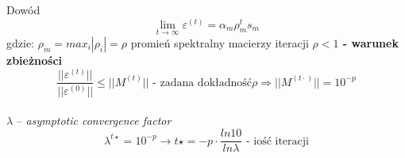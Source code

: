 \begin{frame}{}
  \begin{block}{Dowód}
    \[\lim_{t\to\infty} \varepsilon^{(t)} = \alpha _m \rho _m^t s_m\]
    gdzie: $\rho _m = max_i |\rho _i|= \rho$ promień spektralny macierzy iteracji
    \center \textbf{$\rho < 1$ - warunek zbieżności}
    $$ \frac{||\varepsilon^{(t)}||}{||\varepsilon^{(0)}||} \leq ||M^{(t)}|| \text{ - zadana dokładność} \rho\Rightarrow ||M^{(t \cdot )}|| = 10^{-p}$$
    \\$\lambda$ -- \emph{asymptotic convergence factor}
    \[\lambda^{t\star}=10^{-p} \rightarrow t\star = -p \cdot  \frac{ln 10}{ln \lambda} \text{ - iość iteracji}\]
  \end{block}
\end{frame}
